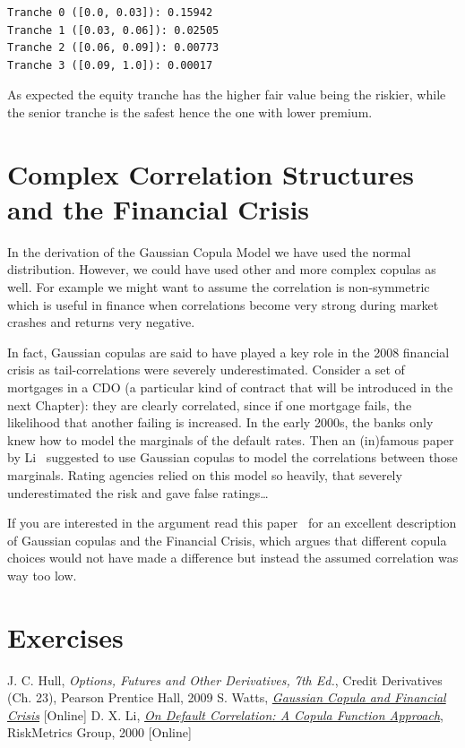 \begin{codebox}
\begin{Verbatim}[commandchars=\\\{\}]
Tranche 0 ([0.0, 0.03]): 0.15942
Tranche 1 ([0.03, 0.06]): 0.02505
Tranche 2 ([0.06, 0.09]): 0.00773
Tranche 3 ([0.09, 1.0]): 0.00017
\end{Verbatim}
\end{codebox}

As expected the equity tranche has the higher fair value being the riskier, while the senior tranche is the safest hence the one with lower premium.

\section{Complex Correlation Structures and the Financial
	Crisis}\label{complex-correlation-structures-and-the-financial-crisis}

In the derivation of the Gaussian Copula Model we have used the normal distribution. However, we could have used other and more complex
copulas as well. For example we might want to assume the correlation is
non-symmetric which is useful in finance when correlations become
very strong during market crashes and returns very negative.

In fact, Gaussian copulas are said to have played a key role in the 2008
financial crisis as tail-correlations were severely underestimated.
Consider a set of mortgages in a CDO (a particular kind of contract that will be introduced in the next Chapter): they are clearly correlated, since if one mortgage fails,
the likelihood that another failing is increased. In the early 2000s,
the banks only knew how to model the marginals of the default rates. Then an
(in)famous paper by Li~\cite{bib:copula_li} suggested to use Gaussian copulas to model the
correlations between those marginals. Rating agencies relied on this model so heavily, that severely underestimated the risk and gave false ratings\ldots

If you are interested in the argument read this paper~\cite{bib:copula_and_2008}
for an excellent description of Gaussian copulas and the Financial
Crisis, which argues that different copula choices would not have made a
difference but instead the assumed correlation was way too low.

\section{Exercises}


\begin{thebibliography}{9}
 J. C. Hull, \emph{Options, Futures and Other Derivatives, 7th Ed.}, Credit Derivatives (Ch. 23), Pearson Prentice Hall, 2009
 S. Watts, \href{http://samueldwatts.com/wp-content/uploads/2016/08/Watts-Gaussian-Copula_Financial_Crisis.pdf}{\emph{Gaussian Copula and Financial Crisis}} [Online]
D. X. Li, \href{http://www.maths.lth.se/matstat/kurser/fmsn15masm23/default.pdf}{\emph{On Default Correlation: A Copula Function Approach}}, RiskMetrics Group, 2000 [Online]
\end{thebibliography}
